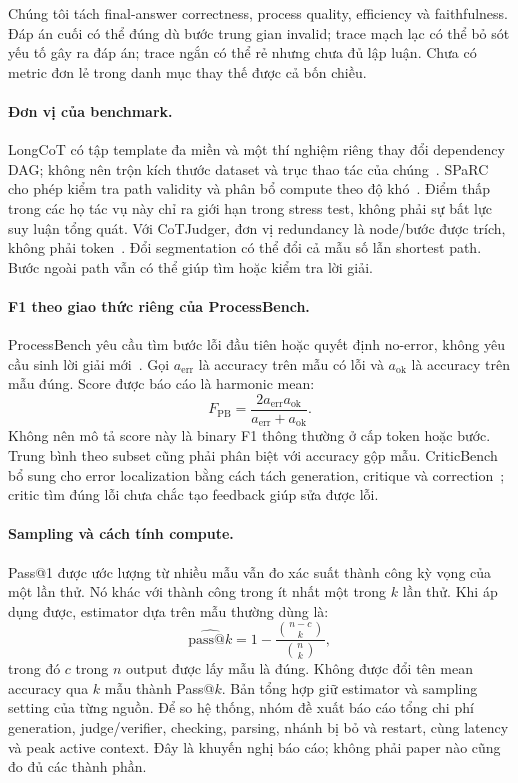 Chúng tôi tách final-answer correctness, process quality, efficiency và faithfulness. Đáp án cuối có thể đúng dù bước trung gian invalid; trace mạch lạc có thể bỏ sót yếu tố gây ra đáp án; trace ngắn có thể rẻ nhưng chưa đủ lập luận. Chưa có metric đơn lẻ trong danh mục thay thế được cả bốn chiều.

\paragraph{Đơn vị của benchmark.}
LongCoT có tập template đa miền và một thí nghiệm riêng thay đổi dependency DAG; không nên trộn kích thước dataset và trục thao tác của chúng~\cite{rra4_longcot}. SPaRC cho phép kiểm tra path validity và phân bổ compute theo độ khó~\cite{rra4_sparc}. Điểm thấp trong các họ tác vụ này chỉ ra giới hạn trong stress test, không phải sự bất lực suy luận tổng quát. Với CoTJudger, đơn vị redundancy là node/bước được trích, không phải token~\cite{rra4_cotjudger}. Đổi segmentation có thể đổi cả mẫu số lẫn shortest path. Bước ngoài path vẫn có thể giúp tìm hoặc kiểm tra lời giải.

\paragraph{F1 theo giao thức riêng của ProcessBench.}
ProcessBench yêu cầu tìm bước lỗi đầu tiên hoặc quyết định no-error, không yêu cầu sinh lời giải mới~\cite{rra4_processbench}. Gọi $a_{\mathrm{err}}$ là accuracy trên mẫu có lỗi và $a_{\mathrm{ok}}$ là accuracy trên mẫu đúng. Score được báo cáo là harmonic mean:
\begin{equation}
F_{\mathrm{PB}}=\frac{2a_{\mathrm{err}}a_{\mathrm{ok}}}{a_{\mathrm{err}}+a_{\mathrm{ok}}}.
\end{equation}
Không nên mô tả score này là binary F1 thông thường ở cấp token hoặc bước. Trung bình theo subset cũng phải phân biệt với accuracy gộp mẫu. CriticBench bổ sung cho error localization bằng cách tách generation, critique và correction~\cite{rra4_criticbench}; critic tìm đúng lỗi chưa chắc tạo feedback giúp sửa được lỗi.

\paragraph{Sampling và cách tính compute.}
Pass@1 được ước lượng từ nhiều mẫu vẫn đo xác suất thành công kỳ vọng của một lần thử. Nó khác với thành công trong ít nhất một trong $k$ lần thử. Khi áp dụng được, estimator dựa trên mẫu thường dùng là:
\begin{equation}
\widehat{\mathrm{pass@}k}=1-\frac{\binom{n-c}{k}}{\binom{n}{k}},
\end{equation}
trong đó $c$ trong $n$ output được lấy mẫu là đúng. Không được đổi tên mean accuracy qua $k$ mẫu thành Pass@$k$. Bản tổng hợp giữ estimator và sampling setting của từng nguồn. Để so hệ thống, nhóm đề xuất báo cáo tổng chi phí generation, judge/verifier, checking, parsing, nhánh bị bỏ và restart, cùng latency và peak active context. Đây là khuyến nghị báo cáo; không phải paper nào cũng đo đủ các thành phần.

